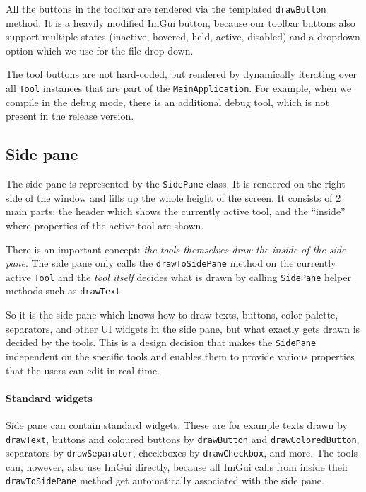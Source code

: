 All the buttons in the toolbar are rendered via the templated \texttt{drawButton} method.
It is a heavily modified ImGui button, because our toolbar buttons also support multiple states (inactive, hovered, held, active, disabled) and a dropdown option which we use for the file drop down.

The tool buttons are not hard-coded, but rendered by dynamically iterating over all \texttt{Tool} instances that are part of the \texttt{MainApplication}.
For example, when we compile in the debug mode, there is an additional debug tool, which is not present in the release version.

\subsection{Side pane}

The side pane is represented by the \texttt{SidePane} class.
It is rendered on the right side of the window and fills up the whole height of the screen.
It consists of 2 main parts: the header which shows the currently active tool, and the ``inside'' where properties of the active tool are shown.

There is an important concept: \emph{the tools themselves draw the inside of the side pane}.
The side pane only calls the \texttt{drawToSidePane} method on the currently active \texttt{Tool} and the \emph{tool itself} decides what is drawn by calling \texttt{SidePane} helper methods such as \texttt{drawText}.

So it is the side pane which knows how to draw texts, buttons, color palette, separators, and other UI widgets in the side pane, but what exactly gets drawn is decided by the tools.
This is a design decision that makes the \texttt{SidePane} independent on the specific tools and enables them to provide various properties that the users can edit in real-time.

\paragraph{Standard widgets}
Side pane can contain standard widgets.
These are for example texts drawn by \texttt{drawText}, buttons and coloured buttons by \texttt{drawButton} and \texttt{drawColoredButton}, separators by \texttt{drawSeparator}, checkboxes by \texttt{drawCheckbox}, and more.
The tools can, however, also use ImGui directly, because all ImGui calls from inside their \texttt{drawToSidePane} method get automatically associated with the side pane.

